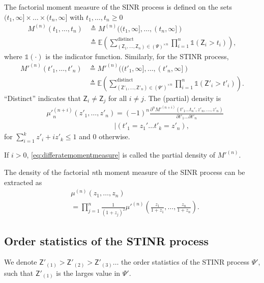 \documentclass[lettersize,journal]{IEEEtran}
\begin{document}
The factorial moment measure of the SINR process is defined on the sets $(t_1,\infty] \times \dots \times (t_n, \infty]$ with $t_1,\dots,t_n\geq 0$
    \begin{align}
      M^{(n)}(t_1,\dots,t_n) &\triangleq M^{(n)}((t_1,\infty],\dots,(t_n,\infty]) \nonumber \\
          & \triangleq \mathbb{E} \left( \sum^{\text{distinct}}_{\left(\mathsf{Z}_1, \dots, \mathsf{Z}_n \right) \in (\Psi)^{\times n}} \prod_{i=1}^n \mathds{1}(\mathsf{Z}_i >t_i)\right),
    \end{align}
    where $\mathds{1}(\cdot)$ is the indicator function. Similarly, for the STINR process,
    \begin{align}
          M'^{(n)}(t'_1,\dots,t'_n) &\triangleq M'^{(n)}((t'_1,\infty],\dots,(t'_n,\infty]) \nonumber \\
              &\triangleq \mathbb{E} \left( \sum^{\text{distinct}}_{\left(\mathsf{Z}'_1, \dots, \mathsf{Z}'_n \right) \in (\Psi')^{\times n}} \prod_{i=1}^n \mathds{1}(\mathsf{Z}'_i >t'_i)\right).
    \end{align}
    ``Distinct'' indicates that $\mathsf{Z}_i \neq \mathsf{Z}_j $ for all $i \neq j $. The (partial) density is
    \begin{align}
      \label{eq:differatemomentmeasure}
     &{\mu'}_n^{(n+i)}(z'_1,\dots,z'_n)= (-1)^n \frac{\partial^n M'^{(n+i)}(t'_1\dots t_n', z'_n, \dots, z'_n)}{\partial t'_1 \dots \partial t'_n} \nonumber\\
      &\hspace{4cm}|(t'_1=z_1'\dots t'_k=z'_n),
    \end{align}
    for $\sum_{i=1}^k z'_i+iz'_k \leq 1$ and $0$ otherwise.

    If $i > 0$, \eqref{eq:differatemomentmeasure} is called the partial density of $M'^{(n)}$. 

    The density of the factorial \textit{n}th moment measure of the SINR process can be extracted as
    \begin{align}
      \label{eq:densitySINR}
      &\mu^{(n)}(z_1,\dots,z_n) \nonumber\\
      &= \prod_{j=1}^n\frac{1}{(1+z_j)^2}\mu'^{(n)}\left(\frac{z_1}{1+z_1},\dots,\frac{z_n}{1+z_n}\right).
    \end{align}

    
  
\subsection{Order statistics of the STINR process}
We denote $\mathsf{Z}'_{(1)}>\mathsf{Z}'_{(2)} >\mathsf{Z}'_{(3)} \dots$ the order statistics of the STINR process $\Psi'$, such that $\mathsf{Z}'_{(1)}$ is the larges value in $\Psi'$.
\end{document}
